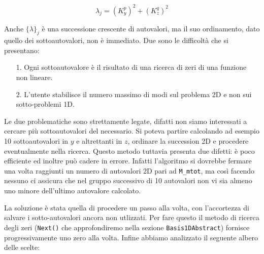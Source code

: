\begin{equation}
\label{eq: autovalori}
 \lambda_j = (K_y^p)^2 + (K_z^q)^2
\end{equation} 

Anche $\{\lambda\}_j$ \`e una successione crescente di autovalori, ma il suo ordinamento, dato quello dei sottoautovalori, non \`e immediato. 
Due sono le difficolt\`a che si presentano:
\begin{itemize}
\item[1.] Ogni sottoautovalore \`e il risultato di una ricerca di zeri di una funzione non lineare.
\item[2.] L'utente stabilisce il numero massimo di modi sul problema 2D e non sui sotto-problemi 1D.
\end{itemize}

Le due problematiche sono strettamente legate, difatti non siamo interessati a cercare pi\`u sottoautovalori del necessario. Si poteva partire 
calcolando ad esempio 10 sottoautovalori in $y$ e altrettanti in $z$, ordinare la succession 2D e procedere eventualmente nella ricerca. Questo 
metodo tuttavia presenta due difetti: \`e poco efficiente ed inoltre pu\`o cadere in errore. Infatti l'algoritmo si dovrebbe fermare una volta 
raggiunti un numero di autovalori 2D pari ad \texttt{M\_mtot}, ma cos\`i facendo nessuno ci assicura che nel gruppo successivo di 10 autovalori 
non vi sia almeno uno minore dell'ultimo autovalore calcolato.

La soluzione \`e stata quella di procedere un passo alla volta, con l'accortezza di salvare i sotto-autovalori ancora non utlizzati. Per fare 
questo il metodo di ricerca degli zeri (\texttt{Next()} che approfondiremo nella sezione \texttt{Basis1DAbstract}) fornisce progressivamente uno 
zero alla volta. Infine abbiamo analizzato il seguente albero delle scelte:


